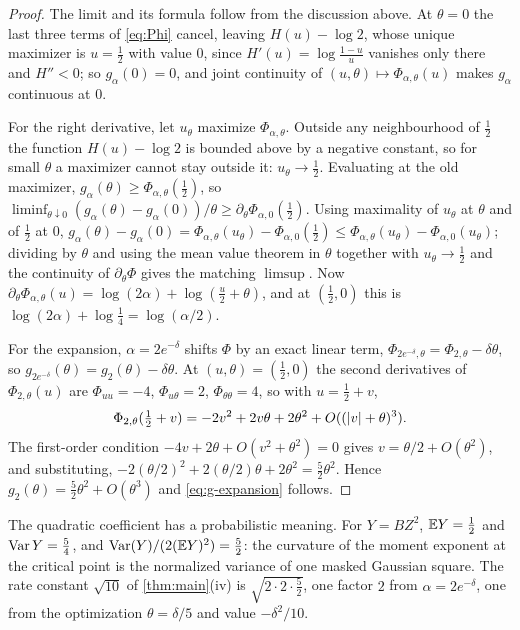 \begin{proof}
The limit and its formula follow from the discussion above. At $\theta=0$ the last three terms of \cref{eq:Phi} cancel, leaving $H(u)-\log2$, whose unique maximizer is $u=\tfrac12$ with value $0$, since $H'(u)=\log\frac{1-u}u$ vanishes only there and $H''<0$; so $g_\alpha(0)=0$, and joint continuity of $(u,\theta)\mapsto\Phi_{\alpha,\theta}(u)$ makes $g_\alpha$ continuous at $0$.

For the right derivative, let $u_\theta$ maximize $\Phi_{\alpha,\theta}$. Outside any neighbourhood of $\tfrac12$ the function $H(u)-\log2$ is bounded above by a negative constant, so for small $\theta$ a maximizer cannot stay outside it: $u_\theta\to\tfrac12$. Evaluating at the old maximizer, $g_\alpha(\theta)\ge\Phi_{\alpha,\theta}(\tfrac12)$, so $\liminf_{\theta\downarrow0}(g_\alpha(\theta)-g_\alpha(0))/\theta\ge\partial_\theta\Phi_{\alpha,0}(\tfrac12)$. Using maximality of $u_\theta$ at $\theta$ and of $\tfrac12$ at $0$, $g_\alpha(\theta)-g_\alpha(0)=\Phi_{\alpha,\theta}(u_\theta)-\Phi_{\alpha,0}(\tfrac12)\le\Phi_{\alpha,\theta}(u_\theta)-\Phi_{\alpha,0}(u_\theta)$; dividing by $\theta$ and using the mean value theorem in $\theta$ together with $u_\theta\to\tfrac12$ and the continuity of $\partial_\theta\Phi$ gives the matching $\limsup$. Now $\partial_\theta\Phi_{\alpha,\theta}(u)=\log(2\alpha)+\log(\tfrac u2+\theta)$, and at $(\tfrac12,0)$ this is $\log(2\alpha)+\log\tfrac14=\log(\alpha/2)$.

For the expansion, $\alpha=2e^{-\delta}$ shifts $\Phi$ by an exact linear term, $\Phi_{2e^{-\delta},\theta}=\Phi_{2,\theta}-\delta\theta$, so $g_{2e^{-\delta}}(\theta)=g_2(\theta)-\delta\theta$. At $(u,\theta)=(\tfrac12,0)$ the second derivatives of $\Phi_{2,\theta}(u)$ are $\Phi_{uu}=-4$, $\Phi_{u\theta}=2$, $\Phi_{\theta\theta}=4$, so with $u=\tfrac12+v$,
\[
\Phi_{2,\theta}(\tfrac12+v)=-2v^2+2v\theta+2\theta^2+O((\left\lvert v\right\rvert+\theta)^3).
\]
The first-order condition $-4v+2\theta+O(v^2+\theta^2)=0$ gives $v=\theta/2+O(\theta^2)$, and substituting, $-2(\theta/2)^2+2(\theta/2)\theta+2\theta^2=\tfrac52\theta^2$. Hence $g_2(\theta)=\tfrac52\theta^2+O(\theta^3)$ and \cref{eq:g-expansion} follows.
\end{proof}

The quadratic coefficient has a probabilistic meaning. For $Y=BZ^2$, $\mathbb{E} Y=\tfrac12$ and $\operatorname{Var} Y=\tfrac54$, and $\operatorname{Var}(Y)/(2(\mathbb{E} Y)^2)=\tfrac52$: the curvature of the moment exponent at the critical point is the normalized variance of one masked Gaussian square. The rate constant $\sqrt{10}$ of \cref{thm:main}(iv) is $\sqrt{2\cdot2\cdot\tfrac52}$, one factor $2$ from $\alpha=2e^{-\delta}$, one from the optimization $\theta=\delta/5$ and value $-\delta^2/10$.

